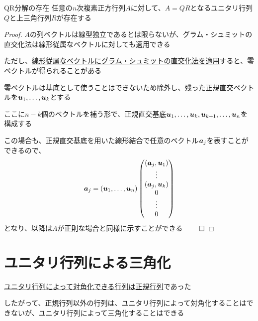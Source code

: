 \documentclass[../../../topic_linear-algebra]{subfiles}
\begin{document}
\begin{theorem}{QR分解の存在}
  任意の$n$次複素正方行列$A$に対して、$A=QR$となるユニタリ行列$Q$と上三角行列$R$が存在する
\end{theorem}

\begin{proof}
  $A$の列ベクトルは線型独立であるとは限らないが、グラム・シュミットの直交化法は線形従属なベクトルに対しても適用できる

  ただし、\hyperref[sec:gram-schmidt-with-dependent-vectors]{線形従属なベクトルにグラム・シュミットの直交化法を適用}すると、零ベクトルが得られることがある

  \br

  零ベクトルは基底として使うことはできないため除外し、残った正規直交ベクトルを$\vb*{u}_1,\ldots,\vb*{u}_k$とする

  ここに$n-k$個のベクトルを補う形で、正規直交基底$\vb*{u}_1,\ldots,\vb*{u}_k,\vb*{u}_{k+1},\ldots,\vb*{u}_n$を構成する

  \br

  この場合も、正規直交基底を用いた線形結合で任意のベクトル$\vb*{a}_j$を表すことができるので、
  \begin{equation*}
    \vb*{a}_j = (\vb*{u}_1,\ldots,\vb*{u}_n) \begin{pmatrix}
      (\vb*{a}_j, \vb*{u}_1) \\
      \vdots                 \\
      (\vb*{a}_j, \vb*{u}_k) \\
      0                      \\
      \vdots                 \\
      0
    \end{pmatrix}
  \end{equation*}
  となり、以降は$A$が正則な場合と同様に示すことができる $\qed$
\end{proof}

\sectionline
\section{ユニタリ行列による三角化}

\hyperref[thm:unitary-diagonalization-of-normal]{ユニタリ行列によって対角化できる行列は正規行列}であった

したがって、正規行列以外の行列は、ユニタリ行列によって対角化することはできないが、ユニタリ行列によって三角化することはできる
\end{document}
